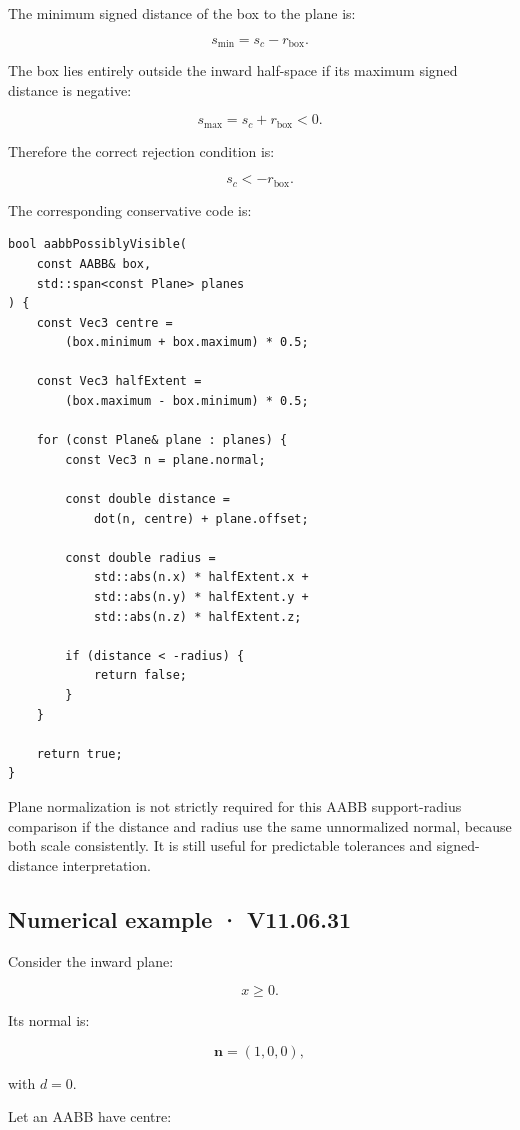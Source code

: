 The minimum signed distance of the box to the plane is:

\[
 s_{\min}=s_c-r_{\mathrm{box}}.
\]

The box lies entirely outside the inward half-space if its maximum signed distance is negative:

\[
 s_{\max}=s_c+r_{\mathrm{box}}<0.
\]

Therefore the correct rejection condition is:

\[
 \boxed{ s_c<-r_{\mathrm{box}} }.
\]

The corresponding conservative code is:

\begin{verbatim}
bool aabbPossiblyVisible(
    const AABB& box,
    std::span<const Plane> planes
) {
    const Vec3 centre =
        (box.minimum + box.maximum) * 0.5;

    const Vec3 halfExtent =
        (box.maximum - box.minimum) * 0.5;

    for (const Plane& plane : planes) {
        const Vec3 n = plane.normal;

        const double distance =
            dot(n, centre) + plane.offset;

        const double radius =
            std::abs(n.x) * halfExtent.x +
            std::abs(n.y) * halfExtent.y +
            std::abs(n.z) * halfExtent.z;

        if (distance < -radius) {
            return false;
        }
    }

    return true;
}
\end{verbatim}

Plane normalization is not strictly required for this AABB support-radius comparison if the distance and radius use the same unnormalized normal, because both scale consistently. It is still useful for predictable tolerances and signed-distance interpretation.

\subsection{Numerical example · V11.06.31}\label{02-foundations-ii-ch034-numerical-example-v11.06.31}

Consider the inward plane:

\[
 x\ge0.
\]

Its normal is:

\[
 \mathbf n=(1,0,0),
\]

with \(d=0\).

Let an AABB have centre:

